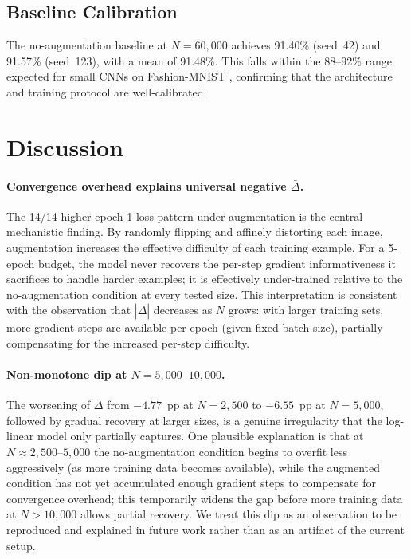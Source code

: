 \documentclass[11pt]{article}
\begin{document}
\subsection{Baseline Calibration}

The no-augmentation baseline at $N{=}60{,}000$ achieves 91.40\% (seed~42) and
91.57\% (seed~123), with a mean of 91.48\%.
This falls within the 88--92\% range expected for small CNNs on Fashion-MNIST
\citep{mukhamediev2024state}, confirming that the architecture and training
protocol are well-calibrated.

\section{Discussion}
\label{sec:discussion}

\paragraph{Convergence overhead explains universal negative $\bar\Delta$.}
The 14/14 higher epoch-1 loss pattern under augmentation is the central
mechanistic finding.
By randomly flipping and affinely distorting each image, augmentation increases
the effective difficulty of each training example.
For a 5-epoch budget, the model never recovers the per-step gradient
informativeness it sacrifices to handle harder examples; it is effectively
under-trained relative to the no-augmentation condition at every tested size.
This interpretation is consistent with the observation that $|\bar\Delta|$
decreases as $N$ grows: with larger training sets, more gradient steps are
available per epoch (given fixed batch size), partially compensating for the
increased per-step difficulty.

\paragraph{Non-monotone dip at $N{=}5{,}000$--$10{,}000$.}
The worsening of $\bar\Delta$ from $-4.77$~pp at $N{=}2{,}500$ to
$-6.55$~pp at $N{=}5{,}000$, followed by gradual recovery at larger sizes, is a
genuine irregularity that the log-linear model only partially captures.
One plausible explanation is that at $N{\approx}2{,}500$--$5{,}000$ the
no-augmentation condition begins to overfit less aggressively (as more training
data becomes available), while the augmented condition has not yet accumulated
enough gradient steps to compensate for convergence overhead; this temporarily
widens the gap before more training data at $N{>}10{,}000$ allows partial
recovery.
We treat this dip as an observation to be reproduced and explained in future
work rather than as an artifact of the current setup.
\end{document}
